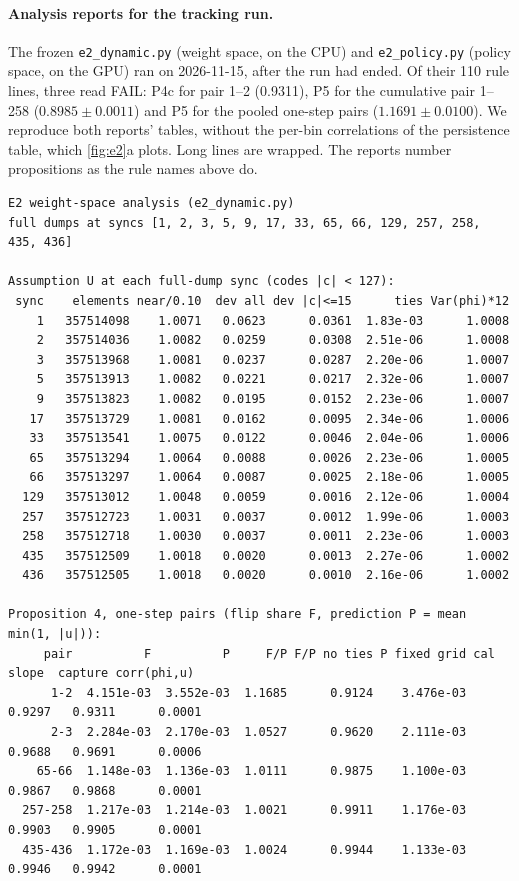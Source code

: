 \paragraph{Analysis reports for the tracking run.} The frozen \texttt{e2\_dynamic.py} (weight space, on the CPU) and \texttt{e2\_policy.py} (policy space, on the GPU) ran on 2026-11-15, after the run had ended. Of their 110 rule lines, three read FAIL: P4c for pair 1--2 (0.9311), P5 for the cumulative pair 1--258 ($0.8985\pm0.0011$) and P5 for the pooled one-step pairs ($1.1691\pm0.0100$). We reproduce both reports' tables, without the per-bin correlations of the persistence table, which \cref{fig:e2}a plots. Long lines are wrapped. The reports number propositions as the rule names above do.
{\scriptsize
\begin{verbatim}
E2 weight-space analysis (e2_dynamic.py)
full dumps at syncs [1, 2, 3, 5, 9, 17, 33, 65, 66, 129, 257, 258, 435, 436]

Assumption U at each full-dump sync (codes |c| < 127):
 sync    elements near/0.10  dev all dev |c|<=15      ties Var(phi)*12
    1   357514098    1.0071   0.0623      0.0361  1.83e-03      1.0008
    2   357514036    1.0082   0.0259      0.0308  2.51e-06      1.0008
    3   357513968    1.0081   0.0237      0.0287  2.20e-06      1.0007
    5   357513913    1.0082   0.0221      0.0217  2.32e-06      1.0007
    9   357513823    1.0082   0.0195      0.0152  2.23e-06      1.0007
   17   357513729    1.0081   0.0162      0.0095  2.34e-06      1.0006
   33   357513541    1.0075   0.0122      0.0046  2.04e-06      1.0006
   65   357513294    1.0064   0.0088      0.0026  2.23e-06      1.0005
   66   357513297    1.0064   0.0087      0.0025  2.18e-06      1.0005
  129   357513012    1.0048   0.0059      0.0016  2.12e-06      1.0004
  257   357512723    1.0031   0.0037      0.0012  1.99e-06      1.0003
  258   357512718    1.0030   0.0037      0.0011  2.23e-06      1.0003
  435   357512509    1.0018   0.0020      0.0013  2.27e-06      1.0002
  436   357512505    1.0018   0.0020      0.0010  2.16e-06      1.0002

Proposition 4, one-step pairs (flip share F, prediction P = mean min(1, |u|)):
     pair          F          P     F/P F/P no ties P fixed grid cal slope  capture corr(phi,u)
      1-2  4.151e-03  3.552e-03  1.1685      0.9124    3.476e-03    0.9297   0.9311      0.0001
      2-3  2.284e-03  2.170e-03  1.0527      0.9620    2.111e-03    0.9688   0.9691      0.0006
    65-66  1.148e-03  1.136e-03  1.0111      0.9875    1.100e-03    0.9867   0.9868      0.0001
  257-258  1.217e-03  1.214e-03  1.0021      0.9911    1.176e-03    0.9903   0.9905      0.0001
  435-436  1.172e-03  1.169e-03  1.0024      0.9944    1.133e-03    0.9946   0.9942      0.0001


\end{verbatim}}
